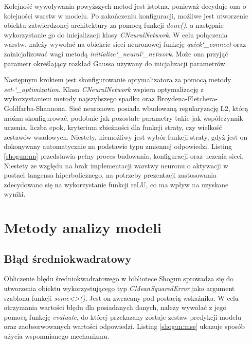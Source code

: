 Kolejność wywoływania powyższych metod jest istotna, ponieważ decyduje ona o kolejności warstw w modelu. Po zakończeniu konfiguracji, możliwe jest utworzenie obiektu zatwierdzonej architektury za pomocą funkcji \textit{done()}, a następnie wykorzystanie go do inicjalizacji klasy \textit{CNeuralNetwork}. W celu połączenia warstw, należy wywołać na obiekcie sieci neuronowej funkcję \textit{quick\char`_connect} oraz zainicjalizować wagi metodą \textit{initialize\char`_neural\char`_network}. Może ona przyjąć parametr określający rozkład Gaussa używany do inicjalizacji parametrów.

Następnym krokiem jest skonfigurowanie optymalizatora za pomocą metody \textit{set-\char`_optimization}. Klasa \textit{CNeuralNetwork} wspiera optymalizację z wykorzystaniem metody najszybszego spadku oraz Broydena-Fletchera-Goldfarba-Shannona. Sieć neuronowa posiada wbudowaną regularyzację L2, którą można skonfigurować, podobnie jak pozostałe parametry takie jak współczynnik uczenia, liczba epok, kryterium zbieżności dla funkcji straty, czy wielkość zestawów wsadowych. Niestety, niemożliwy jest wybór funkcji straty, gdyż jest on dokonywany automatycznie na podstawie typu zmiennej odpowiedzi. Listing \ref{shogun:nn} przedstawia pełny proces budowania, konfiguracji oraz uczenia sieci. Niestety ze względu na brak implementacji warstwy neuronu o aktywacji w postaci tangensa hiperbolicznego, na potrzeby prezentacji zastosowania zdecydowano się na wykorzystanie funkcji reLU, co ma wpływ na uzyskane wyniki.


\section{Metody analizy modeli}

\subsection{Błąd średniokwadratowy}

Obliczenie błędu średniokwadratowego w bibliotece Shogun sprowadza się do utworzenia obiektu wykorzystującego typ \textit{CMeanSquaredError} jako argument szablonu funkcji \textit{some<>()}. Jest on zwracany pod postacią wskaźnika. W celu otrzymania wartości błędu dla posiadanych danych, należy wywołać z jego pomocą funkcję \textit{evaluate}, do której przekazany zostaje zestaw predykcji modelu oraz zaobserwowanych wartości odpowiedzi. Listing \ref{shogun:mse} ukazuje sposób użycia wspomnianego mechanizmu.

